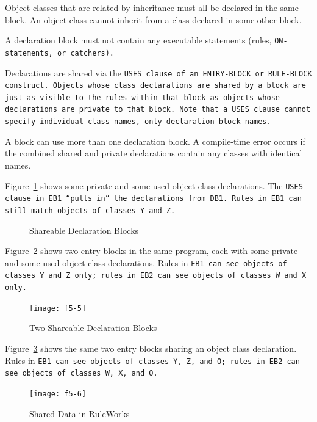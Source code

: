 \begin{note}
  Object classes that are related by inheritance must all be declared
  in the same block. An object class cannot inherit from a class
  declared in some other block.
\end{note}

A declaration block must not contain any executable statements (rules,
\tt{ON-} statements, or catchers).

Declarations are shared via the \tt{USES} clause of an
\tt{ENTRY-BLOCK} or \tt{RULE-BLOCK} construct.  Objects whose class
declarations are shared by a block are just as visible to the rules
within that block as objects whose declarations are private to that
block. Note that a \tt{USES} clause cannot specify individual class
names, only declaration block names.

A block can use more than one declaration block. A compile-time error
occurs if the combined shared and private declarations contain any
classes with identical names.

Figure~\ref{f:5-4} shows some private and some used object class
declarations. The \tt{USES} clause in \tt{EB1} ``pulls in'' the
declarations from \tt{DB1}.  Rules in \tt{EB1} can still match objects
of classes \tt{Y} and \tt{Z}.

\begin{figure}[h]
  \centering
  
  \caption{Shareable Declaration Blocks}
  \label{f:5-4}
\end{figure}

Figure~\ref{f:5-5} shows two entry blocks in the same program, each
with some private and some used object class declarations. Rules in
\tt{EB1} can see objects of classes \tt{Y} and \tt{Z} only; rules in
\tt{EB2} can see objects of classes \tt{W} and \tt{X} only.

\begin{figure}[h]
  \centering
  \texttt{[image: f5-5]}
  \caption{Two Shareable Declaration Blocks}
  \label{f:5-5}
\end{figure}

Figure~\ref{f:5-6} shows the same two entry blocks sharing an object
class declaration. Rules in \tt{EB1} can see objects of classes
\tt{Y}, \tt{Z}, and \tt{O}; rules in \tt{EB2} can see objects of
classes \tt{W}, \tt{X}, and \tt{O}.

\begin{figure}[h]
  \centering
  \texttt{[image: f5-6]}
  \caption{Shared Data in RuleWorks}
  \label{f:5-6}
\end{figure}

